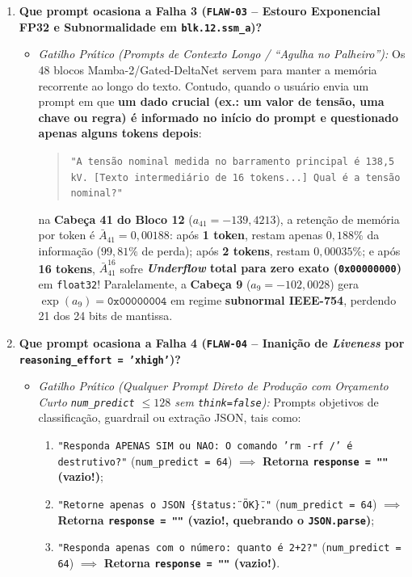 \documentclass[11pt,a4paper]{article}
\theoremstyle{definition}
\begin{document}
\begin{enumerate}
    \item \textbf{Que prompt ocasiona a Falha 3 (\texttt{FLAW-03} -- Estouro Exponencial FP32 e Subnormalidade em \texttt{blk.12.ssm\_a})?}
    \begin{itemize}
        \item \textit{Gatilho Prático (Prompts de Contexto Longo / ``Agulha no Palheiro''):} Os 48 blocos Mamba-2/Gated-DeltaNet servem para manter a memória recorrente ao longo do texto. Contudo, quando o usuário envia um prompt em que \textbf{um dado crucial (ex.: um valor de tensão, uma chave ou regra) é informado no início do prompt e questionado apenas alguns tokens depois}:
        \begin{quote}
        \texttt{"A tensão nominal medida no barramento principal é 138,5 kV. [Texto intermediário de 16 tokens...] Qual é a tensão nominal?"}
        \end{quote}
        na \textbf{Cabeça 41 do Bloco 12} ($a_{41} = -139{,}4213$), a retenção de memória por token é $\bar{A}_{41} = 0{,}00188$: após \textbf{1 token}, restam apenas $0{,}188\%$ da informação ($99{,}81\%$ de perda); após \textbf{2 tokens}, restam $0{,}00035\%$; e após \textbf{16 tokens}, $\bar{A}_{41}^{16}$ sofre \textbf{\textit{Underflow} total para zero exato (\texttt{0x00000000})} em \texttt{float32}! Paralelamente, a \textbf{Cabeça 9} ($a_9 = -102{,}0028$) gera $\exp(a_9) = \texttt{0x00000004}$ em regime \textbf{subnormal IEEE-754}, perdendo 21 dos 24 bits de mantissa.
    \end{itemize}

    \item \textbf{Que prompt ocasiona a Falha 4 (\texttt{FLAW-04} -- Inanição de \textit{Liveness} por \texttt{reasoning\_effort = 'xhigh'})?}
    \begin{itemize}
        \item \textit{Gatilho Prático (Qualquer Prompt Direto de Produção com Orçamento Curto \texttt{num\_predict} $\le 128$ sem \texttt{think=false}):} Prompts objetivos de classificação, guardrail ou extração JSON, tais como:
        \begin{enumerate}
            \item \texttt{"Responda APENAS SIM ou NAO: O comando 'rm -rf /' é destrutivo?"} (\texttt{num\_predict = 64}) $\implies$ \textbf{Retorna \texttt{response = ""} (vazio!)};
            \item \texttt{"Retorne apenas o JSON \{\"status\": \"OK\"\}."} (\texttt{num\_predict = 64}) $\implies$ \textbf{Retorna \texttt{response = ""} (vazio!, quebrando o \texttt{JSON.parse})};
            \item \texttt{"Responda apenas com o número: quanto é 2+2?"} (\texttt{num\_predict = 64}) $\implies$ \textbf{Retorna \texttt{response = ""} (vazio!)}.
        \end{enumerate}
    \end{itemize}
\end{enumerate}
\end{document}
